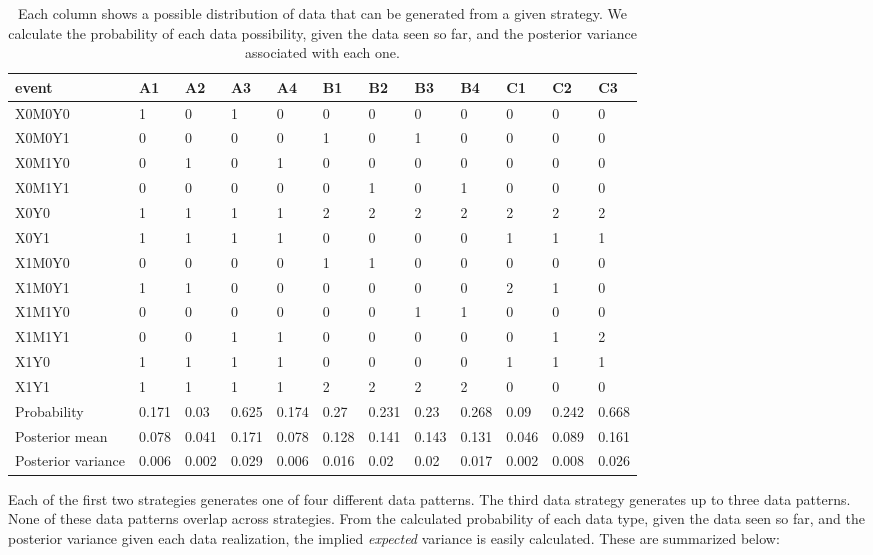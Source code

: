 \documentclass[12pt,]{book}
\begin{document}
\begin{table}[t]

\caption{\label{tab:chselillustration}Each column shows a possible distribution of data that can be generated from a given strategy. We calculate the probability of each data possibility, given the data seen so far, and the posterior variance associated with each one.}
\centering
\begin{tabular}{l|l|l|l|l|l|l|l|l|l|l|l}
\hline
event & A1 & A2 & A3 & A4 & B1 & B2 & B3 & B4 & C1 & C2 & C3\\
\hline
X0M0Y0 & 1 & 0 & 1 & 0 & 0 & 0 & 0 & 0 & 0 & 0 & 0\\
\hline
X0M0Y1 & 0 & 0 & 0 & 0 & 1 & 0 & 1 & 0 & 0 & 0 & 0\\
\hline
X0M1Y0 & 0 & 1 & 0 & 1 & 0 & 0 & 0 & 0 & 0 & 0 & 0\\
\hline
X0M1Y1 & 0 & 0 & 0 & 0 & 0 & 1 & 0 & 1 & 0 & 0 & 0\\
\hline
X0Y0 & 1 & 1 & 1 & 1 & 2 & 2 & 2 & 2 & 2 & 2 & 2\\
\hline
X0Y1 & 1 & 1 & 1 & 1 & 0 & 0 & 0 & 0 & 1 & 1 & 1\\
\hline
X1M0Y0 & 0 & 0 & 0 & 0 & 1 & 1 & 0 & 0 & 0 & 0 & 0\\
\hline
X1M0Y1 & 1 & 1 & 0 & 0 & 0 & 0 & 0 & 0 & 2 & 1 & 0\\
\hline
X1M1Y0 & 0 & 0 & 0 & 0 & 0 & 0 & 1 & 1 & 0 & 0 & 0\\
\hline
X1M1Y1 & 0 & 0 & 1 & 1 & 0 & 0 & 0 & 0 & 0 & 1 & 2\\
\hline
X1Y0 & 1 & 1 & 1 & 1 & 0 & 0 & 0 & 0 & 1 & 1 & 1\\
\hline
X1Y1 & 1 & 1 & 1 & 1 & 2 & 2 & 2 & 2 & 0 & 0 & 0\\
\hline
Probability & 0.171 & 0.03 & 0.625 & 0.174 & 0.27 & 0.231 & 0.23 & 0.268 & 0.09 & 0.242 & 0.668\\
\hline
Posterior mean & 0.078 & 0.041 & 0.171 & 0.078 & 0.128 & 0.141 & 0.143 & 0.131 & 0.046 & 0.089 & 0.161\\
\hline
Posterior variance & 0.006 & 0.002 & 0.029 & 0.006 & 0.016 & 0.02 & 0.02 & 0.017 & 0.002 & 0.008 & 0.026\\
\hline
\end{tabular}
\end{table}

Each of the first two strategies generates one of four different data patterns. The third data strategy generates up to three data patterns. None of these data patterns overlap across strategies.
From the calculated probability of each data type, given the data seen so far, and the posterior variance given each data realization, the implied \emph{expected} variance is easily calculated. These are summarized below:
\end{document}
